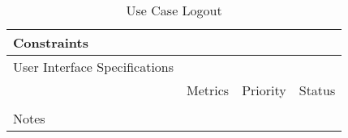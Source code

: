 \begin{table}[H]
\begin{tabularx}{\linewidth}{|l|X|X|X|}
    \hline Constraints                   & \multicolumn{3}{l|}{}                                                                                 \\

    \hline User Interface Specifications & \multicolumn{3}{l|}{}                                                                                 \\

    \hline \multirow{2}{*}{}             & Metrics                                                                           & Priority & Status \\
    \cline{2-4}                          &                                                                                   &          &        \\
    \hline Notes                         & \multicolumn{3}{l|}{}                                                                                 \\
    \hline
  \end{tabularx}
  \caption{Use Case Logout}
  \label{tab:use_case_logout}
\end{table}

